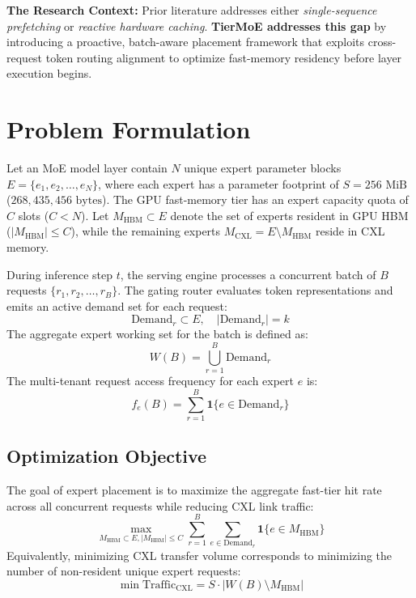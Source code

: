 \documentclass[10pt,journal,compsoc]{IEEEtran}
\begin{document}
\textbf{The Research Context:} Prior literature addresses either \emph{single-sequence prefetching} or \emph{reactive hardware caching}. \textbf{TierMoE addresses this gap} by introducing a proactive, batch-aware placement framework that exploits cross-request token routing alignment to optimize fast-memory residency before layer execution begins.

\section{Problem Formulation}
\label{sec:formulation}

Let an MoE model layer contain $N$ unique expert parameter blocks $E = \{e_1, e_2, \dots, e_N\}$, where each expert has a parameter footprint of $S = 256\text{ MiB}$ ($268,435,456\text{ bytes}$). The GPU fast-memory tier has an expert capacity quota of $C$ slots ($C < N$). Let $M_{\text{HBM}} \subset E$ denote the set of experts resident in GPU HBM ($|M_{\text{HBM}}| \le C$), while the remaining experts $M_{\text{CXL}} = E \setminus M_{\text{HBM}}$ reside in CXL memory.

During inference step $t$, the serving engine processes a concurrent batch of $B$ requests $\{r_1, r_2, \dots, r_B\}$. The gating router evaluates token representations and emits an active demand set for each request:
\begin{equation}
    \text{Demand}_r \subset E, \quad |\text{Demand}_r| = k
\end{equation}
The aggregate expert working set for the batch is defined as:
\begin{equation}
    W(B) = \bigcup_{r=1}^B \text{Demand}_r
\end{equation}
The multi-tenant request access frequency for each expert $e$ is:
\begin{equation}
    f_e(B) = \sum_{r=1}^B \mathbf{1}\{e \in \text{Demand}_r\}
\end{equation}

\subsection{Optimization Objective}
The goal of expert placement is to maximize the aggregate fast-tier hit rate across all concurrent requests while reducing CXL link traffic:
\begin{equation}
    \max_{M_{\text{HBM}} \subset E, |M_{\text{HBM}}| \le C} \sum_{r=1}^B \sum_{e \in \text{Demand}_r} \mathbf{1}\{e \in M_{\text{HBM}}\}
\end{equation}
Equivalently, minimizing CXL transfer volume corresponds to minimizing the number of non-resident unique expert requests:
\begin{equation}
    \min \text{Traffic}_{\text{CXL}} = S \cdot \left| W(B) \setminus M_{\text{HBM}} \right|
\end{equation}
\end{document}
